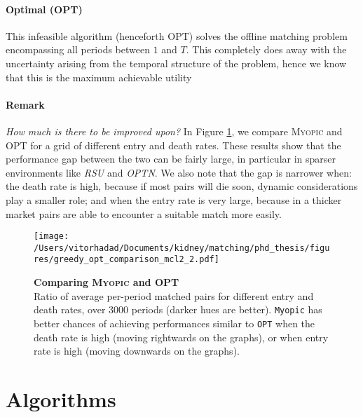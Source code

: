\paragraph{Optimal (\textsc{OPT})} This infeasible algorithm (henceforth OPT) solves the offline matching problem encompassing all periods between $1$ and $T$. This completely does away with the uncertainty arising from the temporal structure of the problem, hence we know that this is the maximum achievable utility 

\paragraph{\textbf{Remark}} \textit{How much is there to be improved upon?} In Figure \ref{fig:greedy_opt_comparison}, we compare \textsc{Myopic} and \textsc{OPT} for a grid of different entry and death rates. These results show that the performance gap between the two can be fairly large, in particular in sparser environments like \emph{RSU} and \emph{OPTN}. We also note that the gap is narrower when: the death rate is high, because if most pairs will die soon, dynamic considerations play a smaller role; and when the entry rate is very large, because in a thicker market pairs are able to encounter a suitable match more easily.

\begin{figure}[htbp]
\centering
\hspace*{-3.5cm}
\texttt{[image: /Users/vitorhadad/Documents/kidney/matching/phd\_thesis/figures/greedy\_opt\_comparison\_mcl2\_2.pdf]}
\caption[Comparing \textsc{Myopic} and \textsc{OPT}]{\textbf{Comparing \textsc{Myopic} and \textsc{OPT}}  \\
Ratio of average per-period matched pairs for different entry and death rates, over 3000 periods (darker hues are better). \texttt{Myopic} has better chances of achieving performances similar to \texttt{OPT} when the death rate is high (moving rightwards on the graphs), or when entry rate is high (moving downwards on the graphs).}
\label{fig:greedy_opt_comparison}
\end{figure}




\section{Algorithms}

